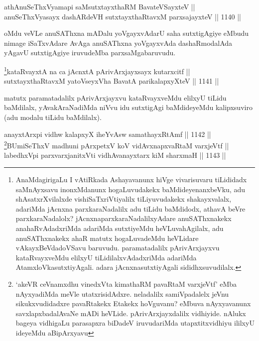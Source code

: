 \begin{shl}
athAnuSeThxVyamapi saMsutxtayxthaRM BavateVSayxteV || \\
anuSeThxVyasayx dashARdeVH sutxtayxthaRtavxM parxsajayxteV \hfill || 1140 ||  
\end{shl}

\begin{artha}
oMdu veVLe anuSAThxna mADalu yoVgayxvAdarU saha sutxtigAgiye eMbudu nimage iSaTxvAdare AvAga anuSAThxna yoVgayxvAda dashaRmodalAda yAgavU sutxtigAgiye iruvudeMba parxsaMgabaruvudu.
\end{artha}


\begin{shl}
\footnote{AnaMdagirigaLu I vAtiRkada Ashayavanunx hiVge vivarisuvaru tiLididadx saMnAyxsavu inonxMdanunx hogaLuvudakekx baMdideyenanxbeVku, adu shAsatxrXvilalxde vishiSaTxriVtiyalilx tiLiyuvudakekx shakayxvalalx, adariMda jAcnxna parxkaraNadalilx adu tiLidu baMdidodx, athavA beVre parxkaraNadalolx? jAcnxnaparxkaraNadalilxyAdare anuSAThxnakekx anahaRvAdadxriMda adariMda sutxtiyeMdu heVLuvahAgilalx, adu anuSAThxnakekx ahaR matutx hogaLuvadeMdu heVLidare vAkayxBeVdadoVSavu baruvudu. paramatadalilx pArivArxjayxvu kataRvayxveMdu elilxyU tiLidilalxvAdadxriMda adariMda AtamxloVkasutxtiyAgali. adara jAcnxnasutxtiyAgali sididhxsuvudilalx.}kataRvayxtA na ca jAcnxtA pArivArxjayxsayx kutarxcitf ||  \\
sutxtayxthaRtavxM yatoV\s seyxVha BavatA parikalapxyXteV \hfill || 1141 ||  
\end{shl}

\begin{artha}
matutx paramatadalilx pArivArxjayxvu kataRvayxveMdu elilxyU tiLidu baMdilalx, yAvakAraNadiMda niVvu idu sutxtigAgi baMdideyeMdu kalipxsuviro (adu modalu tiLidu baMdilalx).
\end{artha}


\begin{shl}
anayxtArxpi vidhw kalapxyX iheYvAsw samathayxRtAmf \hfill || 1142 || \\
\footnote{`akeVR ceVnamxdhu vinedxVta kimathaRM pavaRtaM varxjeVtf' eMba nAyxyadiMda meVle utatxrisidAdxre. neladalilx samiVpadalelx jeVnu sikukxvudidadxre pavaRtakekx Etakekx hoVguvanu? eMbuva nAyxyavanunx savxlapxbadalAvaNe mADi heVLide. pArivArxjayxdalilx vidhiyide. nAlukx bageya vidhigaLu parasapxra biDadeV iruvudariMda utapxtitxvidhiyu ililxyU ideyeMdu aBipArxyavu}BUmiSeThxV madhuni pArxpetxV koV vidAvxnapxvaRtaM varxjeVtf || \\
labedhxV\s pi parxvarxjanitxVti vidhAvanayxtarx kiM sharxmaH \hfill || 1143 ||  
\end{shl}

